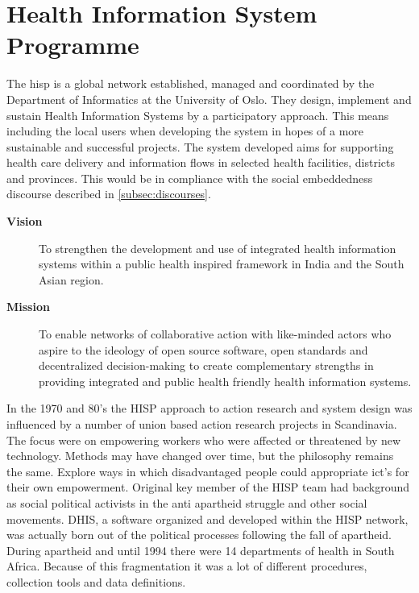 \section{Health Information System Programme}
The \gls{hisp} is a global network established, managed and coordinated by the Department of Informatics at the University of Oslo. They design, implement and sustain Health Information Systems by a participatory approach. This means including the local users when developing the system in hopes of a more sustainable and successful projects. The system developed aims for supporting health care delivery and information flows in selected health facilities, districts and provinces. 
This would be in compliance with the social embeddedness discourse described in \ref{subsec:discourses}.

\begin{description}
\item[\textbf{Vision}]To strengthen the development and use of integrated health information systems within a public health inspired framework in India and
the South Asian region.
\item[\textbf{Mission}]To enable networks of collaborative action with like-minded actors
who aspire to the ideology of open source software, open standards
and decentralized decision-making to create complementary strengths
in providing integrated and public health friendly health information
systems.
\end{description}

In the 1970 and 80's the HISP approach to action research and system design was influenced by a number of union based action research projects in Scandinavia. 
The focus were on empowering workers who were affected or threatened by new technology. 
Methods may have changed over time, but the philosophy remains the same. Explore ways in which disadvantaged people could appropriate \gls{ict}'s for their own empowerment. Original key member of the HISP team had background as social political activists in the anti apartheid struggle and other social movements. DHIS, a software organized and developed within the HISP network, was actually born out of the political processes  following the fall of apartheid. During apartheid and until 1994 there were 14 departments of health in South Africa. Because of this fragmentation it was a lot of different procedures, collection tools and data definitions.

\cite{hisp:uio}
\cite{historyhisp:uio}
\cite{abouthisp:india}

